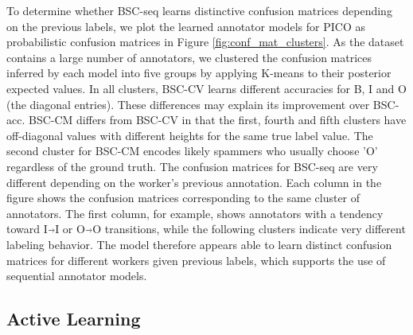 To determine whether BSC-seq learns distinctive confusion matrices depending on the previous labels,
we plot the learned annotator models for
PICO as probabilistic confusion matrices in Figure \ref{fig:conf_mat_clusters}.
As the dataset contains a large number of annotators, we clustered 
the confusion matrices inferred by each model
into five groups by applying K-means to their posterior expected values.
In all clusters, BSC-CV learns different accuracies for B, I and O (the diagonal entries). 
These differences may explain its
improvement over BSC-acc.
BSC-CM differs from BSC-CV in that %
the first, fourth and fifth clusters 
have off-diagonal values with different heights for the same true label value.
 The second 
cluster for BSC-CM encodes likely spammers who usually choose 'O' regardless of the 
ground truth. 
The confusion matrices for BSC-seq are
very different depending on the worker's previous annotation. 
Each column in the figure shows the confusion matrices corresponding to the same cluster of annotators. 
The first column, for example, shows
annotators with a tendency toward I$\Arrow{0.2cm}$I or O$\Arrow{0.2cm}$O transitions, while the following clusters 
indicate very different labeling behavior. The model therefore appears able to learn
distinct confusion matrices for different workers given previous labels, which supports the use of sequential
annotator models.

\subsection{Active Learning}

